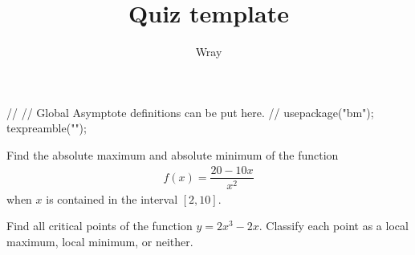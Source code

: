 \documentclass[addpoints, 12pt]{exam}
\title{Quiz template}
\author{Wray}
\begin{document}
\begin{asydef}
//
// Global Asymptote definitions can be put here.
//
usepackage("bm");
texpreamble("\def\V#1{\bm{#1}}");
\end{asydef}



\bigskip

             
\bigskip
\bigskip
\begin{questions}

\question[10]
Find the absolute maximum and absolute minimum of the function 
\begin{align*}
f(x) = \dfrac{20 - 10x}{x^2}
\end{align*}
when $x$ is contained in the interval $[2,10]$.

\clearpage

\question[10]
Find all critical points of the function $y = 2x^3 - 2x$.  Classify each point as a local maximum, local minimum, or neither.

\end{questions}
\end{document}
